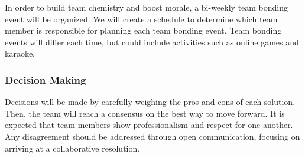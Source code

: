 \documentclass{article}
\begin{document}
In order to build team chemistry and boost morale, a bi-weekly team bonding event will be organized. We will create a schedule to determine which team member is responsible for planning each team bonding event. Team bonding events will differ each time, but could include activities such as online games and karaoke.

\subsubsection*{Decision Making} 

Decisions will be made by carefully weighing the pros and cons of each solution. Then, the team will reach a consensus on the best way to move forward. It is expected that team members show professionalism and respect for one another. Any disagreement should be addressed through open communication, focusing on arriving at a collaborative resolution.
\end{document}
